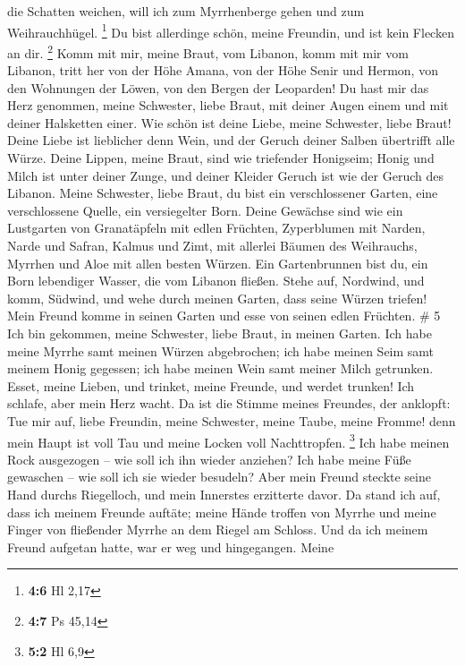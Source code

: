 die Schatten weichen, will ich zum Myrrhenberge gehen und zum
Weihrauchhügel. \footnote{\textbf{4:6} Hl 2,17}  Du bist
allerdinge schön, meine Freundin, und ist kein Flecken an dir.
\footnote{\textbf{4:7} Ps 45,14}  Komm mit mir, meine
Braut, vom Libanon, komm mit mir vom Libanon, tritt her von der Höhe
Amana, von der Höhe Senir und Hermon, von den Wohnungen der Löwen, von
den Bergen der Leoparden!  Du hast mir das Herz genommen,
meine Schwester, liebe Braut, mit deiner Augen einem und mit deiner
Halsketten einer.  Wie schön ist deine Liebe, meine
Schwester, liebe Braut! Deine Liebe ist lieblicher denn Wein, und der
Geruch deiner Salben übertrifft alle Würze.  Deine
Lippen, meine Braut, sind wie triefender Honigseim; Honig und Milch ist
unter deiner Zunge, und deiner Kleider Geruch ist wie der Geruch des
Libanon.  Meine Schwester, liebe Braut, du bist ein
verschlossener Garten, eine verschlossene Quelle, ein versiegelter Born.
 Deine Gewächse sind wie ein Lustgarten von Granatäpfeln
mit edlen Früchten, Zyperblumen mit Narden,  Narde und
Safran, Kalmus und Zimt, mit allerlei Bäumen des Weihrauchs, Myrrhen und
Aloe mit allen besten Würzen.  Ein Gartenbrunnen bist du,
ein Born lebendiger Wasser, die vom Libanon fließen. 
Stehe auf, Nordwind, und komm, Südwind, und wehe durch meinen Garten,
dass seine Würzen triefen! Mein Freund komme in seinen Garten und esse
von seinen edlen Früchten. \# 5  Ich bin gekommen, meine
Schwester, liebe Braut, in meinen Garten. Ich habe meine Myrrhe samt
meinen Würzen abgebrochen; ich habe meinen Seim samt meinem Honig
gegessen; ich habe meinen Wein samt meiner Milch getrunken. Esset, meine
Lieben, und trinket, meine Freunde, und werdet trunken! 
Ich schlafe, aber mein Herz wacht. Da ist die Stimme meines Freundes,
der anklopft: Tue mir auf, liebe Freundin, meine Schwester, meine Taube,
meine Fromme! denn mein Haupt ist voll Tau und meine Locken voll
Nachttropfen. \footnote{\textbf{5:2} Hl 6,9}  Ich habe
meinen Rock ausgezogen -- wie soll ich ihn wieder anziehen? Ich habe
meine Füße gewaschen -- wie soll ich sie wieder besudeln? 
Aber mein Freund steckte seine Hand durchs Riegelloch, und mein
Innerstes erzitterte davor.  Da stand ich auf, dass ich
meinem Freunde auftäte; meine Hände troffen von Myrrhe und meine Finger
von fließender Myrrhe an dem Riegel am Schloss.  Und da
ich meinem Freund aufgetan hatte, war er weg und hingegangen. Meine
